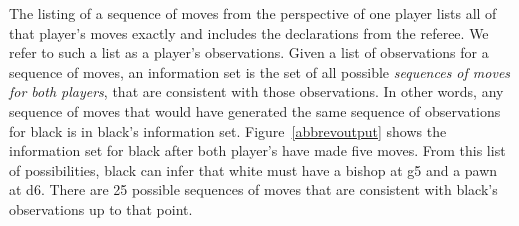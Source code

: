\documentclass[times, 10pt,twocolumn]{article}
\begin{document}
The listing of a sequence of moves from the perspective of one player lists all of that player's moves exactly and
includes the declarations from the referee.  We refer to such a list as a player's observations.  Given a list of
observations for a sequence of moves, an information set is the set of all possible {\em sequences of moves for both
players}, that are consistent with those observations.  In other words, any sequence of moves that would have generated
the same sequence of observations for black is in black's information set.  Figure~\ref{abbrevoutput} shows the
information set for black after both player's have made five moves.  From this list of possibilities, black can infer
that white must have a bishop at g5 and a pawn at d6.  There are 25 possible sequences of moves that are consistent with
black's observations up to that point. 

\end{document}
